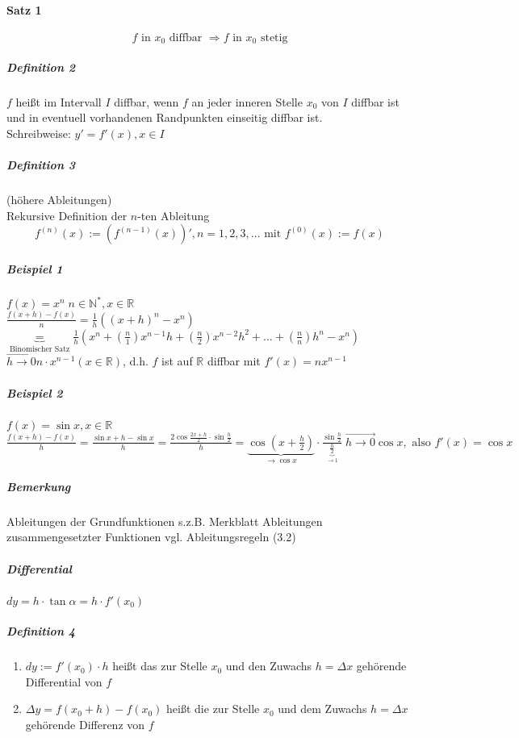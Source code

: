\documentclass[a4paper]{scrartcl}
\begin{document}
\paragraph{Satz 1}
\[ f \text{ in } x_0 \text{ diffbar  } \Rightarrow f \text{ in } x_0 \text{ stetig}\]

\subparagraph{Definition 2} $f$ heißt im Intervall $I$ diffbar, wenn $f$ an jeder inneren Stelle $x_0$ von $I$ diffbar ist und in eventuell vorhandenen Randpunkten einseitig diffbar ist.\\
Schreibweise: $y' = f'(x), x \in I$

\subparagraph{Definition 3} (höhere Ableitungen)\\
Rekursive Definition der $n$-ten Ableitung
\[ f^{(n)} (x) := (f^{(n-1)} (x))', n=1,2,3,\dots \text{ mit } f^{(0)} (x) := f(x)\]

\subparagraph{Beispiel 1} $f(x) = x^n \; n \in \mathbb{N}^*, x\in \mathbb{R}$\\
$\frac{f(x+h) - f(x)}{n} = \frac{1}{h} ((x+h)^n - x^n)$\\ $ \underbrace{=}_{\text{Binomischer Satz}} \frac{1}{h} (x^n + (\frac{n}{1}) x^{n-1} h + (\frac{n}{2}) x ^{n-2} h^2 + \dots + (\frac{n}{n}) h^n - x^n)$\\
$\overrightarrow{h \to 0} n \cdot x^{n-1} ( x \in \mathbb{R})$, d.h. $f$ ist auf $\mathbb{R}$ diffbar mit $f'(x) = nx^{n-1}$

\subparagraph{Beispiel 2} $f(x)=\sin{x}, x \in \mathbb{R}$\\
$\frac{f(x+h) - f(x)}{h} = \frac{\sin{x+h} - \sin{x}}{h} = \frac{2 \cos{\frac{2x+h}{2}} \cdot \sin{\frac{h}{2}}}{h} = \underbrace{\cos{(x+\frac{h}{2})}}_{\to \cos{x}} \cdot \frac{\sin{\frac{h}{2}}}{\underbrace{\frac{h}{2}}_{\to 1}} \; \overrightarrow{h \to 0} \cos{x}, \text{ also } f'(x) = \cos{x}$

\subparagraph{Bemerkung} Ableitungen der Grundfunktionen s.z.B. Merkblatt Ableitungen zusammengesetzter Funktionen vgl. Ableitungsregeln (3.2)

\subparagraph{Differential} $dy = h \cdot \tan{\alpha} = h \cdot f'(x_0)$

\subparagraph{Definition 4}
\begin{enumerate}
\item $dy:= f'(x_0) \cdot h$ heißt das zur Stelle $x_0$ und den Zuwachs $h=\Delta x$ gehörende Differential von $f$
\item $\Delta y = f(x_0 +h) - f(x_0)$ heißt die zur Stelle $x_0$ und dem Zuwachs $h=\Delta x$ gehörende Differenz von $f$
\end{enumerate}
\end{document}
